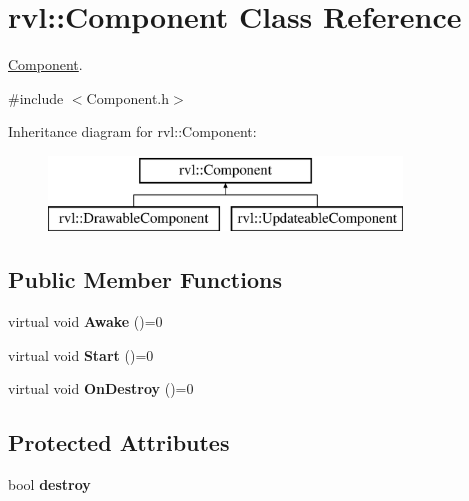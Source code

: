 \hypertarget{classrvl_1_1_component}{}\section{rvl\+:\+:Component Class Reference}
\label{classrvl_1_1_component}


\hyperlink{classrvl_1_1_component}{Component}.  




{\ttfamily \#include $<$Component.\+h$>$}

Inheritance diagram for rvl\+:\+:Component\+:\begin{figure}[H]
\begin{center}
\leavevmode
\includegraphics[height=2.000000cm]{classrvl_1_1_component}
\end{center}
\end{figure}
\subsection*{Public Member Functions}
\begin{DoxyCompactItemize}
\item 
\mbox{\label{classrvl_1_1_component_a497f250d243d1c7de41c0bf4676903b1}} 
virtual void {\bfseries Awake} ()=0
\item 
\mbox{\label{classrvl_1_1_component_ad3e6a3ef9492973b4df7770cc3cf92d2}} 
virtual void {\bfseries Start} ()=0
\item 
\mbox{\label{classrvl_1_1_component_a85b9c9b9750440caf128b61afb20de4c}} 
virtual void {\bfseries On\+Destroy} ()=0
\end{DoxyCompactItemize}
\subsection*{Protected Attributes}
\begin{DoxyCompactItemize}
\item 
\mbox{\label{classrvl_1_1_component_aa5cd621700ec5a36be00f9fbd9ef9b8f}} 
bool {\bfseries destroy}
\end{DoxyCompactItemize}


